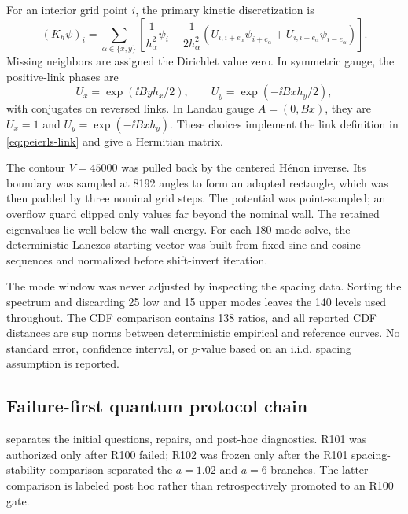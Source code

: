For an interior grid point \(i\), the primary kinetic discretization is
\begin{equation}
 (K_h\psi)_i
 =\sum_{\alpha\in\{x,y\}}
 \left[
 \frac{1}{h_\alpha^2}\psi_i
 -\frac{1}{2h_\alpha^2}
 \left(U_{i,i+e_\alpha}\psi_{i+e_\alpha}
      +U_{i,i-e_\alpha}\psi_{i-e_\alpha}\right)
 \right].
 \label{eq:fd2-covariant}
\end{equation}
Missing neighbors are assigned the Dirichlet value zero.  In symmetric gauge,
the positive-link phases are
\begin{equation}
 U_x=\exp(\ii Byh_x/2),
 \qquad
 U_y=\exp(-\ii Bxh_y/2),
 \label{eq:symmetric-link-phases}
\end{equation}
with conjugates on reversed links.  In Landau gauge \(A=(0,Bx)\), they are
\(U_x=1\) and \(U_y=\exp(-\ii Bxh_y)\).  These choices implement the link
definition in \cref{eq:peierls-link} and give a Hermitian matrix.

The contour \(V=45000\) was pulled back by the centered H\'enon inverse.  Its
boundary was sampled at 8192 angles to form an adapted rectangle, which was
then padded by three nominal grid steps.  The potential was point-sampled;
an overflow guard clipped only values far beyond the nominal wall.  The
retained eigenvalues lie well below the wall energy.  For each 180-mode solve,
the deterministic Lanczos starting vector was built from fixed sine and
cosine sequences and normalized before shift-invert iteration.

The mode window was never adjusted by inspecting the spacing data.  Sorting
the spectrum and discarding 25 low and 15 upper modes leaves the 140 levels
used throughout.  The CDF comparison contains 138 ratios, and all reported
CDF distances are sup norms between deterministic empirical and reference
curves.  No standard error, confidence interval, or \(p\)-value based on an
i.i.d. spacing assumption is reported.

\subsection{Failure-first quantum protocol chain}

 separates the initial questions, repairs,
and post-hoc diagnostics.  R101 was authorized only after R100 failed; R102
was frozen only after the R101 spacing-stability comparison separated the
\(a=1.02\) and \(a=6\) branches.  The latter comparison is labeled post hoc
rather than retrospectively promoted to an R100 gate.

